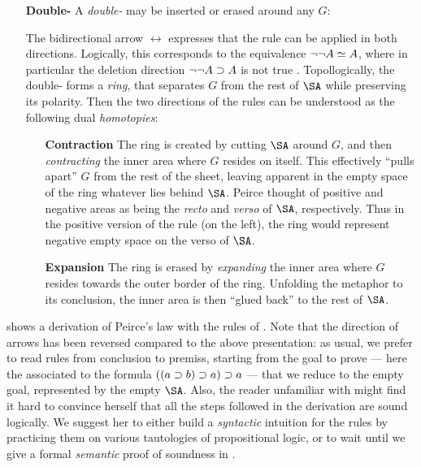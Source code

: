 \begin{itemize}
  \item[\textbf{Double-\kl{cut}}]
    A \emph{double-} may be inserted or erased around any  $G$:
    The bidirectional arrow $\leftrightarrow$ expresses that the rule can be
    applied in both directions.
    Logically, this corresponds to the  equivalence $\neg\neg A
    \simeq A$, where in particular the deletion direction $\neg\neg A \supset A$
    is not true . Topollogically, the double- forms a
    \emph{ring}, that separates $G$ from the rest of $\SA$ while preserving its
    polarity. Then the two directions of the rules can be understood as the
    following dual \emph{homotopies}:
    \begin{itemize}
      \item[\textbf{Contraction}] The ring is created by cutting $\SA$ around
      $G$, and then \emph{contracting} the inner area where $G$ resides on
      itself. This effectively ``pulls apart'' $G$ from the rest of the sheet,
      leaving apparent in the empty space of the ring whatever lies behind
      $\SA$. Peirce thought of positive and negative areas as being the
      \emph{recto} and \emph{verso} of $\SA$, respectively. Thus in the positive
      version of the rule (on the left), the ring would represent negative empty
      space on the verso of $\SA$.
      \item[\textbf{Expansion}] The ring is erased by \emph{expanding} the inner
      area where $G$ resides towards the outer border of the ring. Unfolding the
      metaphor to its conclusion, the inner area is then ``glued back'' to the
      rest of $\SA$.
    \end{itemize}
\end{itemize}

 shows a derivation of Peirce's law with the rules of
. Note that the direction of arrows has been reversed compared to the
above presentation: as usual, we prefer to read rules from conclusion to
premiss, starting from the goal to prove --- here the  associated to the
formula $((a \supset b) \supset a) \supset a$ --- that we reduce to the empty goal,
represented by the empty $\SA$. Also, the reader unfamiliar with  might find
it hard to convince herself that all the steps followed in the derivation are
sound logically. We suggest her to either build a \emph{syntactic} intuition for
the rules by practicing them on various tautologies of propositional logic, or
to wait until we give a formal \emph{semantic} proof of soundness in
.

